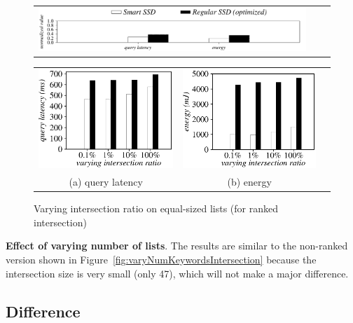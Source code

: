   \begin{figure}[tbp]
  \centering
    \begin{tabular}{ccc}
 \includegraphics[width=0.52\columnwidth]{figures/banner2.pdf}
\end{tabular}
\vspace{-0.1cm}
\renewcommand{\tabcolsep}{0.1mm}
  \begin{tabular}{ccc}
 \includegraphics[width=0.5\columnwidth]{figures/RankIntersection-time-VaryInterRatio-equal2.eps}&
  \includegraphics[width=0.5\columnwidth]{figures/RankIntersection-energy-VaryInterRatio-equal2.eps}\\
  (a) query latency & (b) energy\\
\end{tabular}
  \caption{Varying intersection ratio on equal-sized lists (for ranked intersection)}
  \label{fig:varyRankInterRatioIntersection2}
 \end{figure}


\textbf{Effect of varying number of lists}.
The results are similar to the non-ranked version shown in Figure~\ref{fig:varyNumKeywordsIntersection} because the intersection size is very small (only 47), which will not make a major difference.

\subsection{Difference}\label{sec:expDifference}

